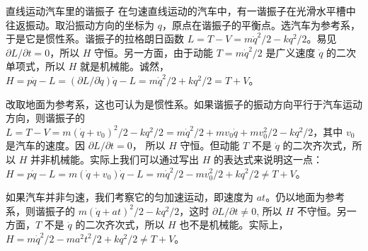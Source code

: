 \begin{example}{直线运动汽车里的谐振子}
在匀速直线运动的汽车中，有一谐振子在光滑水平槽中往返振动。取沿振动方向的坐标为 $q$，原点在谐振子的平衡点。选汽车为参考系，于是它是惯性系。谐振子的拉格朗日函数 $L=T-V=m \dot{q}^{2} / 2-k q^{2} / 2$。易见 $\partial L / \partial t=0$，所以 $H $ 守恒。另一方面，由于动能 $T=m \dot{q}^{2} / 2$ 是广义速度 $\dot q $ 的二次单项式，所以 $H $ 就是机械能。诚然，$ H=p\dot q-L=(\partial L / \partial \dot{q}) \dot{q}-L=m \dot{q}^{2} / 2+k q^{2} / 2=T+V$。

改取地面为参考系，这也可认为是惯性系。如果谐振子的振动方向平行于汽车运动方向，则谐振子的 $L=T-V=m\left(\dot{q}+v_{0}\right)^{2} / 2-k q^{2} / 2=m \dot{q}^{2} / 2+m v_{0} \dot{q}+m v_{0}^{2} / 2-k q^{2} / 2$，其中 $v_0$ 是汽车的速度。因 $\partial L / \partial t=0$， 所以 $H $ 守恒。但动能 $T$ 不是 $\dot q $ 的二次齐次式，所以 $H $ 并非机械能。实际上我们可以通过写出 $H$ 的表达式来说明这一点：$H=p \dot{q}-L=m\left(\dot{q}+v_{0}\right) \dot{q}-L=m \dot{q}^{2} / 2-m v_{0}^{2} / 2+k q^{2} / 2 \neq T+V$。

如果汽车并非匀速，我们考察它的匀加速运动，即速度为 $at $。仍以地面为参考系，则谐振子的 $m(\dot{q}+a t)^{2} / 2-k q^{2} / 2$，这时 $\partial L / \partial t \neq 0$, 所以 $H $ 不守恒。另一方面，$T$ 不是 $\dot q $ 的二次齐次式，所以 $H$ 也不是机械能。实际上，$H=m \dot{q}^{2} / 2-m a^{2} t^{2} / 2+k q^{2} / 2 \neq T+V$。
\end{example}

